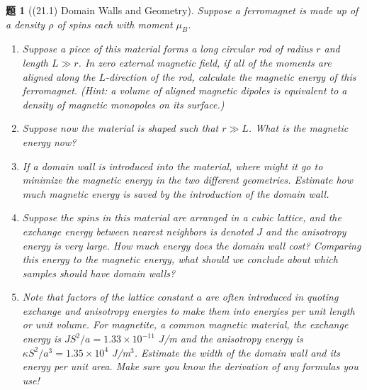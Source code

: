 \documentclass[UTF8,10pt,a4paper]{article}
\theoremstyle{Problem}
\newtheorem{prob}{题}
\theoremstyle{Solution}
\begin{document}
\thispagestyle{FirstPageStyle}
\begin{prob}[(21.1) Domain Walls and Geometry]
    Suppose a ferromagnet is made up of a density $\rho$ of spins each with moment $\mu_B$.
    \begin{enumerate}
        \item[(a)] Suppose a piece of this material forms a long circular rod of radius $r$ and length $L\gg r$. In zero external magnetic field, if all of the moments are aligned along the $L$-direction of the rod, calculate the magnetic energy of this ferromagnet. (Hint: a volume of aligned magnetic dipoles is equivalent to a density of magnetic monopoles on its surface.)
        \item[(b)] Suppose now the material is shaped such that $r\gg L$. What is the magnetic energy now?
        \item[(c)] If a domain wall is introduced into the material, where might it go to minimize the magnetic energy in the two different geometries. Estimate how much magnetic energy is saved by the introduction of the domain wall.
        \item[(d)] Suppose the spins in this material are arranged in a cubic lattice, and the exchange energy between nearest neighbors is denoted $J$ and the anisotropy energy is very large. How much energy does the domain wall cost? Comparing this energy to the magnetic energy, what should we conclude about which samples should have domain walls?
        \item[(e)] Note that factors of the lattice constant $a$ are often introduced in quoting exchange and anisotropy energies to make them into energies per unit length or unit volume. For magnetite, a common magnetic material, the exchange energy is $JS^2/a=1.33\times 10^{-11}$ J/m and the anisotropy energy is $\kappa S^2/a^3=1.35\times 10^4$ J/m$^3$. Estimate the width of the domain wall and its energy per unit area. \textit{Make sure you know the derivation of any formulas you use!}
    \end{enumerate}
\end{prob}
\end{document}
